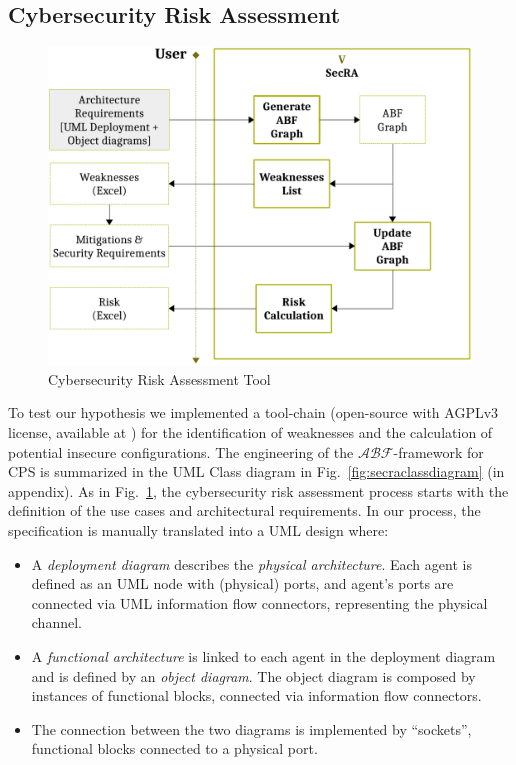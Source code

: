 \documentclass[runningheads]{llncs}
\newcommand{\assertionRegion}{\mathcal{A}}
\newcommand{\beliefRegion}{\mathcal{B}}
\newcommand{\factRegion}{\mathcal{F}}
\newcommand{\abftheory}{\assertionRegion\beliefRegion\factRegion}
\begin{document}
\subsection{Cybersecurity Risk Assessment}\label{sec:secra}
\begin{figure}[t]
	\centering
	\includegraphics[width=.5\columnwidth]{v-secra.pdf}
	\caption{Cybersecurity Risk Assessment Tool}
	\label{fig:secra}
\end{figure}
To test our hypothesis we implemented a tool-chain (open-source with
AGPLv3 license, available at \autocite{v-research2020cybersecurity-anonymous}) for the
identification of weaknesses and the calculation of potential insecure
configurations. The engineering of the $\abftheory$-framework for CPS is summarized in the UML
Class diagram in Fig.~\ref{fig:secraclassdiagram} (in appendix). 
As in Fig.~\ref{fig:secra}, the cybersecurity risk assessment process
starts with the definition of the use cases and architectural requirements.  In our process, the specification is manually
translated into a UML design where:
\begin{itemize}
	\item A \emph{deployment diagram} describes the \emph{physical
		architecture}. Each agent is defined as an UML node with (physical)
		ports, and agent's ports are connected via UML information flow
		connectors, representing the physical channel.
	\item A \emph{functional architecture} is linked to each agent in the
		deployment diagram and is defined by an \emph{object diagram}.
		The object diagram is composed by instances of functional
		blocks, connected via information flow connectors.
	\item The connection between the two diagrams is implemented by
		``sockets'', functional blocks connected to a 
		physical port.
\end{itemize}
\end{document}
